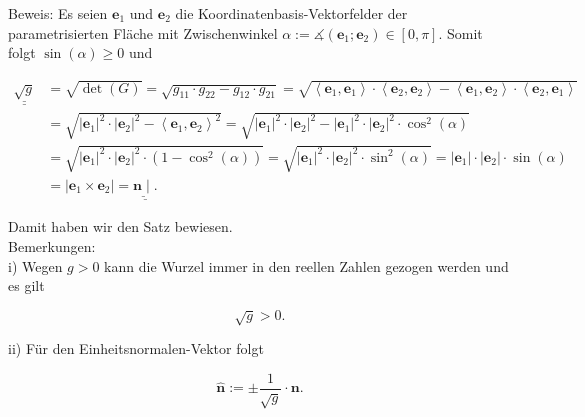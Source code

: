 \documentclass[10pt]{article}
\begin{document}
Beweis: Es seien $\mathbf{e}_{1}$ und $\mathbf{e}_{2}$ die Koordinatenbasis-Vektorfelder der parametrisierten Fläche mit Zwischenwinkel $\alpha:=\measuredangle\left(\mathbf{e}_{1} ; \mathbf{e}_{2}\right) \in[0, \pi]$. Somit folgt $\sin (\alpha) \geq 0$ und


\begin{align*}
\underline{\underline{\sqrt{g}}} & =\sqrt{\operatorname{det}(G)}=\sqrt{g_{11} \cdot g_{22}-g_{12} \cdot g_{21}}=\sqrt{\left\langle\mathbf{e}_{1}, \mathbf{e}_{1}\right\rangle \cdot\left\langle\mathbf{e}_{2}, \mathbf{e}_{2}\right\rangle-\left\langle\mathbf{e}_{1}, \mathbf{e}_{2}\right\rangle \cdot\left\langle\mathbf{e}_{2}, \mathbf{e}_{1}\right\rangle} \\
& =\sqrt{\left|\mathbf{e}_{1}\right|^{2} \cdot\left|\mathbf{e}_{2}\right|^{2}-\left\langle\mathbf{e}_{1}, \mathbf{e}_{2}\right\rangle^{2}}=\sqrt{\left|\mathbf{e}_{1}\right|^{2} \cdot\left|\mathbf{e}_{2}\right|^{2}-\left|\mathbf{e}_{1}\right|^{2} \cdot\left|\mathbf{e}_{2}\right|^{2} \cdot \cos ^{2}(\alpha)} \\
& =\sqrt{\left|\mathbf{e}_{1}\right|^{2} \cdot\left|\mathbf{e}_{2}\right|^{2} \cdot\left(1-\cos ^{2}(\alpha)\right)}=\sqrt{\left|\mathbf{e}_{1}\right|^{2} \cdot\left|\mathbf{e}_{2}\right|^{2} \cdot \sin ^{2}(\alpha)}=\left|\mathbf{e}_{1}\right| \cdot\left|\mathbf{e}_{2}\right| \cdot \sin (\alpha) \\
& =\left|\mathbf{e}_{1} \times \mathbf{e}_{2}\right|=\underline{\underline{\mathbf{n} \mid} .} \tag{2.110}
\end{align*}


Damit haben wir den Satz bewiesen.\\
Bemerkungen:\\
i) Wegen $g>0$ kann die Wurzel immer in den reellen Zahlen gezogen werden und es gilt


\begin{equation*}
\sqrt{g}>0 . \tag{2.111}
\end{equation*}


ii) Für den Einheitsnormalen-Vektor folgt


\begin{equation*}
\hat{\mathbf{n}}:= \pm \frac{1}{\sqrt{g}} \cdot \mathbf{n} . \tag{2.112}
\end{equation*}
\end{document}
